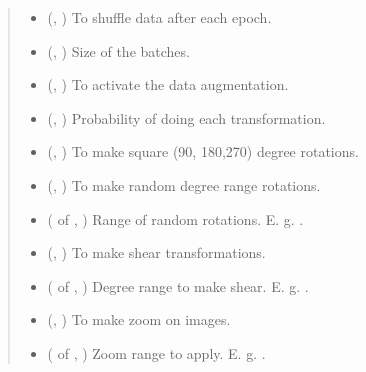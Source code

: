 \documentclass[letterpaper,10pt,english]{sphinxmanual}
\begin{document}
\begin{fulllineitems}
\begin{quote}
\begin{description}
\begin{itemize}
\item {} 
 (, ) \textendash{} To shuffle data after each epoch.

\item {} 
 (, ) \textendash{} Size of the batches.

\item {} 
 (, ) \textendash{} To activate the data augmentation.

\item {} 
 (, ) \textendash{} Probability of doing each transformation.

\item {} 
 (, ) \textendash{} To make square (90, 180,270) degree rotations.

\item {} 
 (, ) \textendash{} To make random degree range rotations.

\item {} 
 ( of , ) \textendash{} Range of random rotations. E. g. .

\item {} 
 (, ) \textendash{} To make shear transformations.

\item {} 
 ( of , ) \textendash{} Degree range to make shear. E. g. .

\item {} 
 (, ) \textendash{} To make zoom on images.

\item {} 
 ( of , ) \textendash{} Zoom range to apply. E. g. .


\end{itemize}
\end{description}
\end{quote}
\end{fulllineitems}
\end{document}
